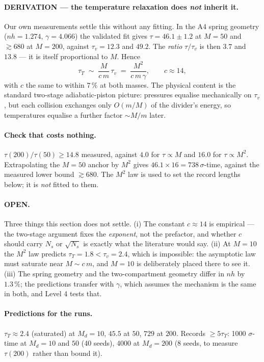 \documentclass[11pt,a4paper]{article}
\begin{document}
\paragraph{DERIVATION --- the temperature relaxation does \emph{not} inherit it.} Our own
measurements settle this without any fitting. In the A4 spring geometry ($nh = 1.274$,
$\gamma = 4.066$) the validated fit gives $\tau = 46.1 \pm 1.2$ at $M = 50$ and $\gtrsim 680$ at
$M = 200$, against $\tau_v = 12.3$ and $49.2$. The \emph{ratio} $\tau/\tau_v$ is then $3.7$ and
$13.8$ --- it is itself proportional to $M$. Hence
\begin{equation}
\tau_T \;\sim\; \frac{M}{c\,m}\,\tau_v \;=\; \frac{M^2}{c\,m\,\gamma},\qquad c \approx 14 ,
\label{eq:tauT}
\end{equation}
with $c$ the same to within $7\,\%$ at both masses. The physical content is the standard two-stage
adiabatic-piston picture: pressures equalise mechanically on $\tau_v$, but each collision exchanges
only $O(m/M)$ of the divider's energy, so temperatures equalise a further factor $\sim M/m$ later.

\paragraph{Check that costs nothing.} $\tau(200)/\tau(50) \ge 14.8$ measured, against $4.0$ for
$\tau \propto M$ and $16.0$ for $\tau \propto M^2$. Extrapolating the $M = 50$ anchor by $M^2$ gives
$46.1 \times 16 = 738\,\sigma$-time, against the measured lower bound $\gtrsim 680$. The $M^2$ law
is used to set the record lengths below; it is \emph{not} fitted to them.

\paragraph{OPEN.} Three things this section does not settle. (i) The constant $c \approx 14$ is
empirical --- the two-stage argument fixes the \emph{exponent}, not the prefactor, and whether $c$
should carry $N_s$ or $\sqrt{N_s}$ is exactly what the literature would say. (ii) At $M = 10$ the
$M^2$ law predicts $\tau_T = 1.8 < \tau_v = 2.4$, which is impossible: the asymptotic law must
saturate near $M \sim c\,m$, and $M = 10$ is deliberately placed there to see it. (iii) The spring
geometry and the two-compartment geometry differ in $nh$ by $1.3\,\%$; the predictions transfer with
$\gamma$, which assumes the mechanism is the same in both, and Level 4 tests that.

\paragraph{Predictions for the runs.} $\tau_T \approx 2.4$ (saturated) at $M_d = 10$, $45.5$ at
$50$, $729$ at $200$. Records $\ge 5\tau_T$: 1000 $\sigma$-time at $M_d = 10$ and $50$ (40 seeds),
4000 at $M_d = 200$ (8 seeds, to measure $\tau(200)$ rather than bound it).
\end{document}
